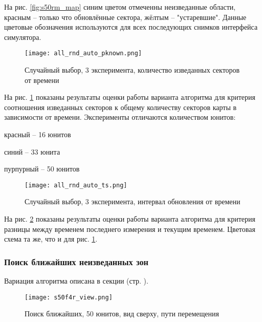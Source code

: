 На рис. \ref{fig:s50rm_map} синим цветом отмеченны неизведанные области, красным --
только что обновлённые сектора, жёлтым -- "устаревшие". Данные цветовые обозначения
используются для всех последующих снимков интерфейса симулятора.

\begin{figure}[h!]
    \centering
    \texttt{[image: all\_rnd\_auto\_pknown.png]}
    \caption{Случайный выбор, 3 эксперимента, количество изведанных секторов от времени}
    \label{fig:all_rnd_auto_pk}
\end{figure}

На рис. \ref{fig:all_rnd_auto_pk} показаны результаты оценки работы варианта алгоритма для
критерия соотношения изведанных секторов к общему количеству секторов карты в зависимости
от времени. Эксперименты отличаются количеством юнитов:
\begin{mintemize}
\item красный -- 16 юнитов
\item синий -- 33 юнита
\item пурпурный -- 50 юнитов
\end{mintemize}

\begin{figure}[h!]
    \centering
    \texttt{[image: all\_rnd\_auto\_ts.png]}
    \caption{Случайный выбор, 3 эксперимента, интервал обновления от времени}
    \label{fig:all_rnd_auto_ts}
\end{figure}

\newpage

На рис. \ref{fig:all_rnd_auto_ts} показаны результаты оценки работы варианта алгоритма для
критерия разницы между временем последнего измерения и текущим временем.
Цветовая схема та же, что и для рис. \ref{fig:all_rnd_auto_pk}.

\clearpage
\newpage

\subsubsection{Поиск ближайших неизведанных зон}

Вариация алгоритма описана в секции  (стр. \pageref{ref:algo:choise:find}).

\begin{figure}[h!]
    \centering
    \texttt{[image: s50f4r\_view.png]}
    \caption{Поиск ближайших, 50 юнитов, вид сверху, пути перемещения}
    \label{fig:s50f4r_view}
\end{figure}

